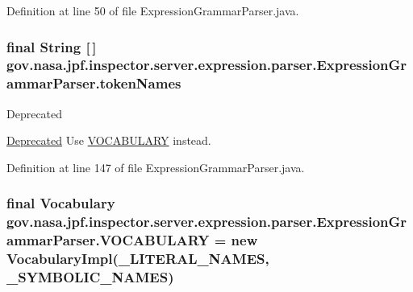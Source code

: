 Definition at line 50 of file Expression\+Grammar\+Parser.\+java.

\subsubsection[{\texorpdfstring{token\+Names}{tokenNames}}]{\setlength{\rightskip}{0pt plus 5cm}final String \mbox{[}$\,$\mbox{]} gov.\+nasa.\+jpf.\+inspector.\+server.\+expression.\+parser.\+Expression\+Grammar\+Parser.\+token\+Names\hspace{0.3cm}{\ttfamily [static]}}\hypertarget{classgov_1_1nasa_1_1jpf_1_1inspector_1_1server_1_1expression_1_1parser_1_1_expression_grammar_parser_a8ac9c984f8ea713cacd30e5b839aee93}{}\label{classgov_1_1nasa_1_1jpf_1_1inspector_1_1server_1_1expression_1_1parser_1_1_expression_grammar_parser_a8ac9c984f8ea713cacd30e5b839aee93}
\begin{DoxyRefDesc}{Deprecated}
\item[\hyperlink{deprecated__deprecated000004}{Deprecated}]Use \hyperlink{classgov_1_1nasa_1_1jpf_1_1inspector_1_1server_1_1expression_1_1parser_1_1_expression_grammar_parser_a0d75d95fc62c9d67d9b9e8a82ddbbc7a}{V\+O\+C\+A\+B\+U\+L\+A\+RY} instead.\end{DoxyRefDesc}


Definition at line 147 of file Expression\+Grammar\+Parser.\+java.

\subsubsection[{\texorpdfstring{V\+O\+C\+A\+B\+U\+L\+A\+RY}{VOCABULARY}}]{\setlength{\rightskip}{0pt plus 5cm}final Vocabulary gov.\+nasa.\+jpf.\+inspector.\+server.\+expression.\+parser.\+Expression\+Grammar\+Parser.\+V\+O\+C\+A\+B\+U\+L\+A\+RY = new Vocabulary\+Impl({\bf \+\_\+\+L\+I\+T\+E\+R\+A\+L\+\_\+\+N\+A\+M\+ES}, {\bf \+\_\+\+S\+Y\+M\+B\+O\+L\+I\+C\+\_\+\+N\+A\+M\+ES})\hspace{0.3cm}{\ttfamily [static]}}\hypertarget{classgov_1_1nasa_1_1jpf_1_1inspector_1_1server_1_1expression_1_1parser_1_1_expression_grammar_parser_a0d75d95fc62c9d67d9b9e8a82ddbbc7a}{}\label{classgov_1_1nasa_1_1jpf_1_1inspector_1_1server_1_1expression_1_1parser_1_1_expression_grammar_parser_a0d75d95fc62c9d67d9b9e8a82ddbbc7a}


